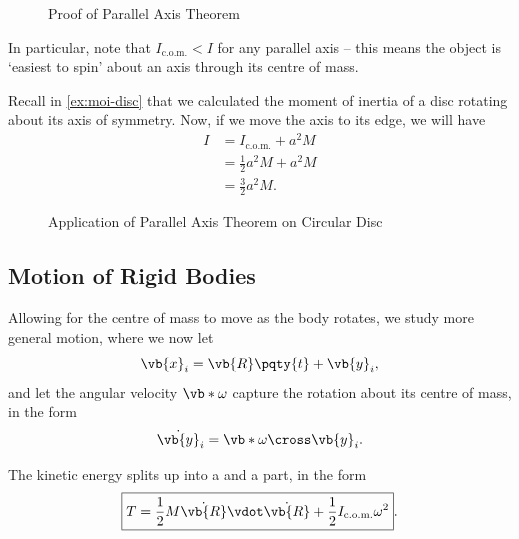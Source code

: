 \begin{figure}[ht!]
    \centering

    \caption{Proof of Parallel Axis Theorem}
    \label{fig:parallel-axis-thm-proof}%
\end{figure}

In particular, note that \(I_{\text{c.o.m.}} < I\) for any parallel axis -- this means the object is `easiest to spin' about an axis through its centre of mass.

\begin{example}
    \label{ex:parallel-axis-thm-disc}%
    Recall in \autoref{ex:moi-disc} that we calculated the moment of inertia of a disc rotating about its axis of symmetry. Now, if we move the axis to its edge, we will have
    \begin{subequations}\begin{align}
        I &= I_{\text{c.o.m.}} + a^2 M \\
        &= \frac{1}{2} a^2 M + a^2 M \\
        &= \frac{3}{2} a^2 M.
    \end{align}\end{subequations}
\end{example}

\begin{figure}[ht!]
    \centering

    \caption{Application of Parallel Axis Theorem on Circular Disc}
    \label{fig:parallel-axis-thm-application-disc}%
\end{figure}

\subsection{Motion of Rigid Bodies}

Allowing for the centre of mass to move as the body rotates, we study more general motion, where we now let
\begin{equation}
    \vb{x}_i = \vb{R} \pqty{t} + \vb{y}_i,
\end{equation}
and let the angular velocity \(\vb*{\omega}\) capture the rotation about its centre of mass, in the form
\begin{equation}
    \dot{\vb{y}}_i = \vb*{\omega} \cross \vb{y}_i.
\end{equation}

\begin{proposition}
    \label{prop:rotational-kinetic-energy}%
    The kinetic energy splits up into a  and a  part, in the form
    \begin{equation}
        \boxed{T = \frac{1}{2} M \dot{\vb{R}} \vdot \dot{\vb{R}} + \frac{1}{2} I_{\text{c.o.m.}} \omega^2}.
    \end{equation}
\end{proposition}

